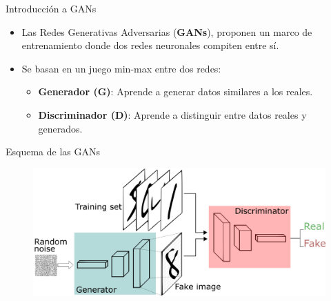 \documentclass[aspectratio=169,xcolor=dvipsnames, t, spanish]{beamer}
\begin{document}

\begin{frame}{Introducción a GANs}
    \begin{itemize}
        \item Las Redes Generativas Adversarias (\textbf{GANs}), proponen un marco de entrenamiento donde dos redes neuronales compiten entre sí.
        \pause
        \item Se basan en un juego min-max entre dos redes:
        \pause
        \begin{itemize}
            \item \textbf{Generador (G)}: Aprende a generar datos similares a los reales.
            \pause
            \item \textbf{Discriminador (D)}: Aprende a distinguir entre datos reales y generados.
        \end{itemize}
    \end{itemize}
\end{frame}

\begin{frame}{Esquema de las GANs}
    \begin{figure}
        \centering
        \includegraphics[width=0.9\linewidth]{figures/GANs.png}
        \label{fig:enter-label}
    \end{figure}
\end{frame}
\end{document}
